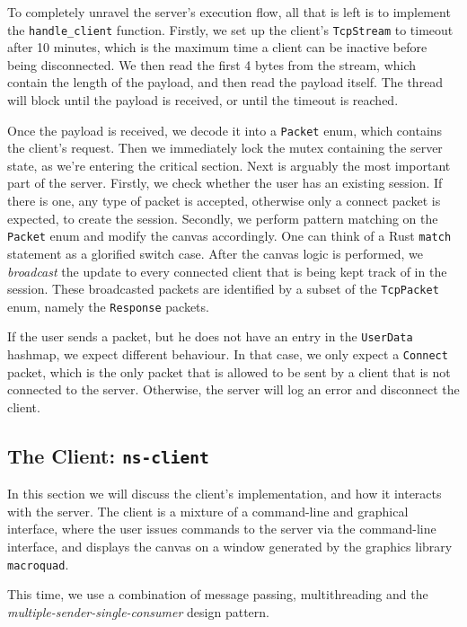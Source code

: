 \documentclass{article}
\newcommand{\code}[1]{\texttt{#1}}
\begin{document}
To completely unravel the server's execution flow, all that is left is to
implement the \code{handle\_client} function. Firstly, we set up the client's
\code{TcpStream} to timeout after 10 minutes, which is the maximum time a client
can be inactive before being disconnected. We then read the first 4 bytes from
the stream, which contain the length of the payload, and then read the payload
itself. The thread will block until the payload is received, or until the
timeout is reached.

Once the payload is received, we decode it into a \code{Packet} enum, which
contains the client's request. Then we immediately lock the mutex containing the
server state, as we're entering the critical section. Next is arguably the most
important part of the server. Firstly, we check whether the user has an existing
session. If there is one, any type of packet is accepted, otherwise only a
connect packet is expected, to create the session. Secondly, we perform pattern
matching on the \code{Packet} enum and modify the canvas accordingly. One can
think of a Rust \code{match} statement as a glorified switch case. After the
canvas logic is performed, we \textit{broadcast} the update to every connected
client that is being kept track of in the session. These broadcasted packets are
identified by a subset of the \code{TcpPacket} enum, namely the \code{Response}
packets.

If the user sends a packet, but he does not have an entry in the \code{UserData}
hashmap, we expect different behaviour. In that case, we only expect a
\code{Connect} packet, which is the only packet that is allowed to be sent by a
client that is not connected to the server. Otherwise, the server will log an
error and disconnect the client.

\newpage

\subsection{The Client: \code{ns-client}}

In this section we will discuss the client's implementation, and how it
interacts with the server. The client is a mixture of a command-line and
graphical interface, where the user issues commands to the server via the
command-line interface, and displays the canvas on a window generated by the
graphics library \code{macroquad}.


This time, we use a combination of message passing, multithreading and the
\textit{multiple-sender-single-consumer} design pattern.
\end{document}

